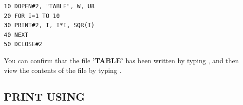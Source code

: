 \begin{description}[leftmargin=2cm,style=nextline]
\begin{tcolorbox}[colback=black,coltext=white]
\verbatimfont{\codefont}
\begin{verbatim}
10 DOPEN#2, "TABLE", W, U8
20 FOR I=1 TO 10
30 PRINT#2, I, I*I, SQR(I)
40 NEXT
50 DCLOSE#2
\end{verbatim}
\end{tcolorbox}

                  You can confirm that the file {\bf 'TABLE'} has been written by typing , and then view the contents of the file by typing .

\end{description}


\newpage
\subsection{PRINT USING}
